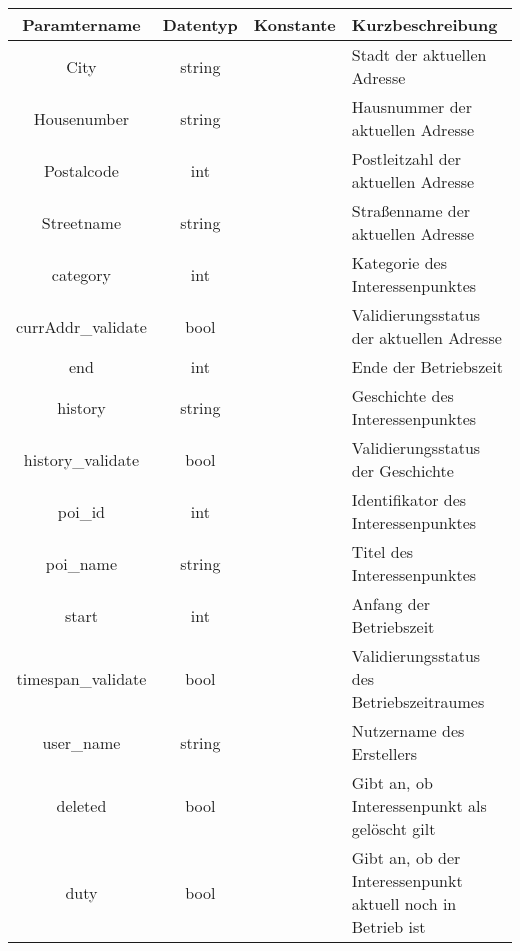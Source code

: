 \begin{table}[H]
	\begin{tabular}{|c|c|c|p{6.5cm}|}
		\hline
		\textbf{Paramtername} & \textbf{Datentyp} & \textbf{Konstante} & \textbf{Kurzbeschreibung}    \\ \hline
		City               & string            &                 & Stadt der aktuellen Adresse \\ \hline
		Housenumber        & string            &                 & Hausnummer der aktuellen Adresse \\ \hline
		Postalcode         & int               &                 & Postleitzahl der aktuellen Adresse \\ \hline
		Streetname         & string            &                 & Straßenname der aktuellen Adresse \\ \hline
		category           & int               &                 & Kategorie des Interessenpunktes \\ \hline
		currAddr\_validate & bool              &                 & Validierungsstatus der aktuellen Adresse \\ \hline
		end                & int               &                 & Ende der Betriebszeit \\ \hline
		history            & string            &                 & Geschichte des Interessenpunktes \\ \hline
		history\_validate  & bool              &                 & Validierungsstatus der Geschichte \\ \hline
		poi\_id            & int               &                 & Identifikator des Interessenpunktes \\ \hline
		poi\_name          & string            &                 & Titel des Interessenpunktes \\ \hline
		start              & int               &                 & Anfang der Betriebszeit \\ \hline
		timespan\_validate & bool              &                 & Validierungsstatus des Betriebszeitraumes \\ \hline
		user\_name         & string            &                 & Nutzername des Erstellers \\ \hline
		deleted            & bool              &                 & Gibt an, ob Interessenpunkt als gelöscht gilt \\ \hline
		duty               & bool              &                 & Gibt an, ob der Interessenpunkt aktuell noch in Betrieb ist \\ \hline

\end{tabular}
\end{table}
